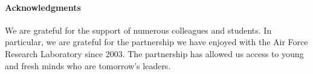 \paragraph*{Acknowledgments}

We are grateful for the support of numerous colleagues and
students. In particular, we are grateful for the partnership we have
enjoyed with the Air Force Research Laboratory since 2003. The
partnership has allowed us access to young and fresh minds who are
tomorrow's leaders.


